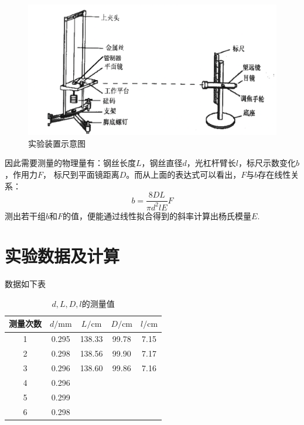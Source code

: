 \documentclass[UTF8]{ctexart}
\begin{document}
\begin{figure}[h]
    \centering
    \includegraphics[scale=0.3]{3.png}
    \caption{实验装置示意图}
\end{figure}

因此需要测量的物理量有：钢丝长度$L$，钢丝直径$d$，光杠杆臂长$l$，标尺示数变化$b$，作用力$F$，
标尺到平面镜距离$D$。而从上面的表达式可以看出，$F$与$b$存在线性关系：
\[b=\frac{8DL}{\pi d^2lE}F\]
测出若干组$b$和$F$的值，便能通过线性拟合得到的斜率计算出杨氏模量$E$.
\section{实验数据及计算}
数据如下表
\begin{table}[H]\centering
    \begin{tabular}{ccccc}
        \hline\hline
        测量次数 & $d/ \mathrm{mm}$ & $L/ \mathrm{cm}$ & $D/ \mathrm{cm}$ & $l/ \mathrm{cm}$ \\
        \hline
        1 & 0.295 & 138.33 & 99.78 & 7.15\\
        2 & 0.298 & 138.56 & 99.90 & 7.17\\
        3 & 0.296 & 138.60 & 99.86 & 7.16\\
        4 & 0.296\\
        5 & 0.299\\
        6 & 0.298\\
        \hline\hline
    \end{tabular}
    \caption{$d,L,D,l$的测量值}
\end{table}
\end{document}
